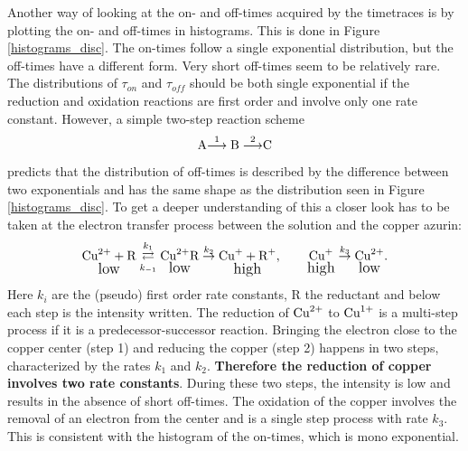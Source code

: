 \documentclass[twoside,single]{lion-msc}
\begin{document}
Another way of looking at the on- and off-times acquired by the timetraces is by plotting the on- and off-times in histograms. This is done in Figure \ref{histograms_disc}. The on-times follow a single exponential distribution, but the off-times have a different form. Very short off-times seem to be relatively rare. The distributions of  $\tau_{on}$ and  $\tau_{off}$ should be both single exponential if the reduction and oxidation reactions are first order and involve only one rate constant. However, a simple two-step reaction scheme
\begin{equation}\label{ox_pros1}
\textup{A}{\overset{1}{\longrightarrow}\textup{B}\overset{2}{\longrightarrow}}\textup{C}
\end{equation}
predicts that the distribution of off-times is described by the difference between two exponentials \cite{Smiley2006} and has the same shape as the distribution seen in Figure \ref{histograms_disc}. To get a deeper understanding of this a closer look has to be taken at the electron transfer process between the solution and the copper azurin:
\begin{equation}\label{ox_pros2}
\underset{\textup{\large low}}{\textup{Cu}^{2+} + \textup{R}} \overset{k_{1}}{\underset{k_{-1}}\rightleftarrows} \underset{\textup{\large low}}{\textup{Cu}^{2+}\textup{R}} \overset{k_{2}}\rightarrow \underset{\textup{\large high}}{\textup{Cu}^{+} + \textup{R}^{+}},  \qquad \underset{\textup{\large high}}{\textup{Cu}^{+}} \overset{k_{3}}\rightarrow \underset{\textup{\large low}}{\textup{Cu}^{2+}}.
\end{equation}
Here $k_{i}$ are the (pseudo) first order rate constants, R the reductant and below each step is the intensity written. The reduction of $\textup{Cu}^{2+}$ to $\textup{Cu}^{1+}$ is a multi-step process if it is a predecessor-successor reaction. Bringing the electron close to the copper center (step 1) and reducing the copper (step 2) happens in two steps, characterized by the rates $k_{1}$ and $k_{2}$. \textbf{Therefore the reduction of copper involves two rate constants}. During these two steps, the intensity is low and results in the absence of short off-times. The oxidation of the copper  involves the removal of an electron from the center and is a single step process with rate $k_{3}$. This is consistent with the histogram of the on-times, which is mono exponential.
\end{document}
